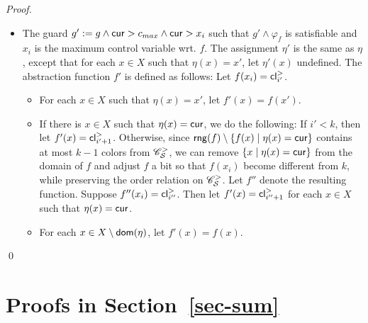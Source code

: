 \begin{appendix}
{\begin{proof}
\begin{itemize}
\begin{itemize}
\begin{itemize}
\item For each $x \in X \setminus \dom(\eta)$, let $f'(x)=f(x)$.  
\end{itemize}
%
\item The guard $g' := g \wedge \mathsf{cur} > c_{max} \wedge  \mathsf{cur} > x_i$ such that $g' \wedge \varphi_f$ is satisfiable and $x_i$ is the maximum control variable wrt. $f$. The assignment $\eta'$ is the same as $\eta$, except that for each $x \in X$ such that $\eta(x)=x'$, let $\eta'(x)$ undefined.  The abstraction function $f'$ is defined as follows: Let $f(x_i)=\mathsf{cl}^>_{i'}$.
\begin{itemize}
\item For each $x \in X$ such that $\eta(x)=x'$, let $f'(x)=f(x')$.
%
\item If there is $x \in X$ such that $\eta(x)=\mathsf{cur}$, we do the following: If $i' < k$, then let $f'(x)= \mathsf{cl}^{>}_{i'+1}$. Otherwise, since $\mathsf{rng}(f) \setminus \{f(x) \mid \eta(x)=\mathsf{cur}\}$ contains at most $k-1$ colors from $\mathscr{C}^>_{\mathcal{S} }$,  we can remove $\{x \mid \eta(x)=\mathsf{cur}\}$ from the domain of $f$ and adjust $f$ a bit so that $f(x_i)$ become different from $k$, while preserving the order relation on $\mathscr{C}^>_{\mathcal{S} }$. Let $f''$ denote the resulting function. Suppose $f''(x_i)=\mathsf{cl}^>_{i''}$. Then let $f'(x)=\mathsf{cl}^>_{i''+1}$ for each $x \in X$ such that $\eta(x)=\mathsf{cur}$. 

\item For each $x \in X \setminus \dom(\eta)$, let $f'(x)=f(x)$. 
\end{itemize}
\end{itemize}
\end{itemize}
\qed
\end{proof}
}
\section{Proofs in Section~\ref{sec-sum}}



\end{appendix}
